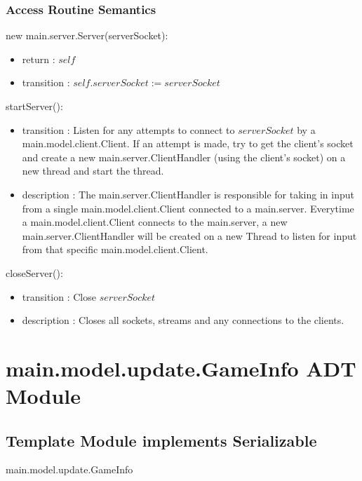 \documentclass[12pt, titlepage]{article}
\begin{document}
    \subsubsection* {Access Routine Semantics}
    
        \noindent new main.server.Server(serverSocket):
        \begin{itemize}
        \item return : $self$
        \item transition : $self.serverSocket := serverSocket$
        \end{itemize}
        
        \noindent startServer():
        \begin{itemize}
        \item transition : Listen for any attempts to connect to $serverSocket$ by a main.model.client.Client. If an attempt is made, try to get the client's socket and create a new main.server.ClientHandler (using the client's socket) on a new thread and start the thread.
        \item description : The main.server.ClientHandler is responsible for taking in input from a single main.model.client.Client connected to a main.server. Everytime a main.model.client.Client connects to the main.server, a new main.server.ClientHandler will be created on a new Thread to listen for input from that specific main.model.client.Client.
        \end{itemize}
        
        \noindent closeServer():
        \begin{itemize}
        \item transition : Close $serverSocket$
        \item description : Closes all sockets,  streams and any connections to the clients.
        \end{itemize}
        
                
                        
        
\section* {main.model.update.GameInfo ADT Module}
    \subsection* {Template Module implements Serializable}
    main.model.update.GameInfo
\end{document}
